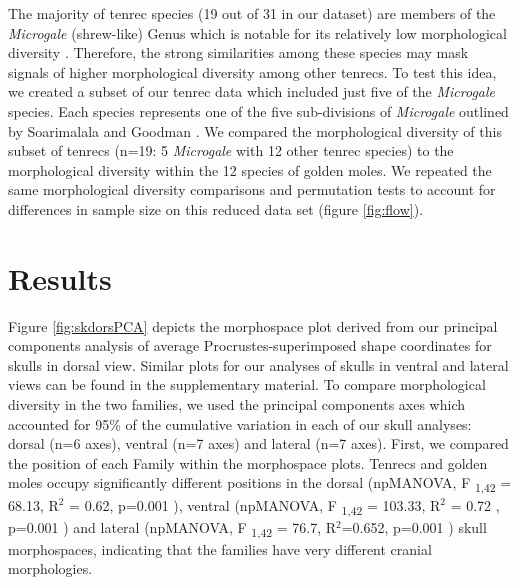\documentclass[12pt,a4paper]{article}
\begin{document}
	The majority of tenrec species (19 out of 31 in our dataset) are members of the \textit{Microgale} (shrew-like) Genus which is notable for its relatively low morphological diversity \citep{Soarimalala2011, Jenkins2003}. Therefore, the strong similarities among these species may mask signals of higher morphological diversity among other tenrecs. 
	To test this idea, we created a subset of our tenrec data which included just five of the \textit{Microgale} species. Each species represents one of the five sub-divisions of \textit{Microgale} outlined by Soarimalala and Goodman \citeyearpar{Soarimalala2011}. We compared the morphological diversity of this subset of tenrecs (n=19: 5 \textit{Microgale} with 12 other tenrec species) to the morphological diversity within the 12 species of golden moles. We repeated the same morphological diversity comparisons and permutation tests to account for differences in sample size on this reduced data set (figure \ref{fig:flow}).
	 



\section{Results}
 
	Figure \ref{fig:skdorsPCA} depicts the morphospace plot derived from our principal components analysis of average Procrustes-superimposed shape coordinates for skulls in dorsal view. Similar plots for our analyses of skulls in ventral and lateral views can be found in the supplementary material.
	To compare morphological diversity in the two families, we used the principal components axes which accounted for 95\% of the cumulative variation in each of our skull analyses: dorsal (n=6 axes), ventral (n=7 axes) and lateral (n=7 axes). 
	First, we compared the position of each Family within the morphospace plots. Tenrecs and golden moles occupy significantly different positions in the dorsal 	(npMANOVA, F \textsubscript{1,42} = 68.13, R$^2$ = 0.62, p=0.001 ), ventral (npMANOVA, F \textsubscript{1,42} = 103.33, R$^2$ = 0.72 , p=0.001 ) and lateral (npMANOVA, F \textsubscript{1,42} = 76.7, R$^2$=0.652, p=0.001 ) skull morphospaces,  indicating that the families have very different cranial morphologies. 
\end{document}
